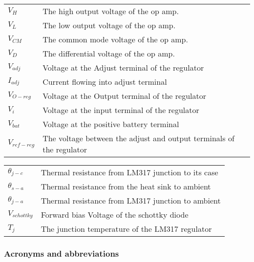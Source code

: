 \begin{tabularx}{\textwidth}{@{}p{2.5cm}L}
   $V_H$ & The high output voltage of the op amp.\\
   
   $V_L$ & The low output voltage of the op amp.\\
   $V_{CM}$ & The common mode voltage of the op amp.\\
   $V_{D}$ & The differential voltage of the op amp.\\
     
     
     $V_{adj}$ & Voltage at the Adjust terminal of the regulator\\
    $I_{adj}$ & Current flowing into adjust terminal\\
     $V_{O-reg}$ & Voltage at the Output terminal of the regulator\\
      $V_{i}$ & Voltage at the input terminal of the regulator\\
       $V_{bat}$ & Voltage at the positive battery terminal\\
       $V_{ref-reg}$ & The voltage between the adjust and output terminals of the regulator\\
       
   
       
    
\end{tabularx}
\endgroup

\newpage
\begingroup
\renewcommand{\arraystretch}{1.2}
\renewcommand{\tabularxcolumn}[1]{p{#1}}
\begin{tabularx}{\textwidth}{@{}p{2.5cm}L}
     
        $\theta_{j-c}$ &    Thermal resistance from LM317 junction to its case   \\
          $\theta_{s-a}$ &      Thermal resistance from the heat sink to ambient \\
         
   $\theta_{j-a}$ &     Thermal resistance from LM317 junction to ambient  \\
          $V_{schottky}$ & Forward bias Voltage of the schottky diode\\
          $T_j$ & The junction temperature of the LM317 regulator\\

\end{tabularx}
\endgroup


\newpage
\subsubsection*{Acronyms and abbreviations}




